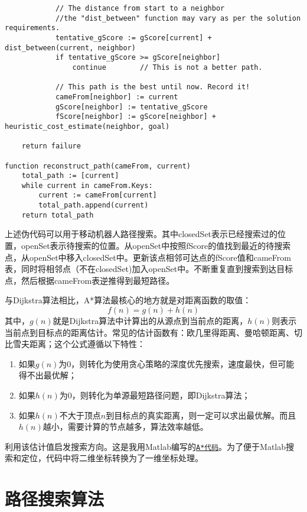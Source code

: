 \begin{lstlisting}
            // The distance from start to a neighbor
            //the "dist_between" function may vary as per the solution requirements.
            tentative_gScore := gScore[current] + dist_between(current, neighbor)
            if tentative_gScore >= gScore[neighbor]
                continue		// This is not a better path.

            // This path is the best until now. Record it!
            cameFrom[neighbor] := current
            gScore[neighbor] := tentative_gScore
            fScore[neighbor] := gScore[neighbor] + heuristic_cost_estimate(neighbor, goal) 

    return failure

function reconstruct_path(cameFrom, current)
    total_path := [current]
    while current in cameFrom.Keys:
        current := cameFrom[current]
        total_path.append(current)
    return total_path
\end{lstlisting}
上述伪代码可以用于移动机器人路径搜索。其中closedSet表示已经搜索过的位置，openSet表示待搜索的位置。从openSet中按照fScore的值找到最近的待搜索点，从openSet中移入closedSet中。更新该点相邻可达点的fScore值和cameFrom表，同时将相邻点（不在closedSet)加入openSet中。不断重复直到搜索到达目标点，然后根据cameFrom表逆推得到最短路径。

与Dijkstra算法相比，A*算法最核心的地方就是对距离函数的取值：
\begin{equation*}
	f(n) = g(n) + h(n)
\end{equation*}
其中，$g(n)$就是Dijkstra算法中计算出的从源点到当前点的距离，$h(n)$则表示当前点到目标点的距离估计。常见的估计函数有：欧几里得距离、曼哈顿距离、切比雪夫距离；这个公式遵循以下特性：
\begin{enumerate}
\item 如果$g(n)$为0，则转化为使用贪心策略的深度优先搜索，速度最快，但可能得不出最优解；
\item 如果$h(n)$为0，则转化为单源最短路径问题，即Dijkstra算法；
\item {\color{red} 如果$h(n)$不大于顶点$n$到目标点的真实距离，则一定可以求出最优解}。而且$h(n)$越小，需要计算的节点越多，算法效率越低。
\end{enumerate}

利用该估计值启发搜索方向。这是我用Matlab编写的\href{/attachment/myastar.m}{\texttt{A*代码}}。为了便于Matlab搜索和定位，代码中将二维坐标转换为了一维坐标处理。

\section{路径搜索算法}
